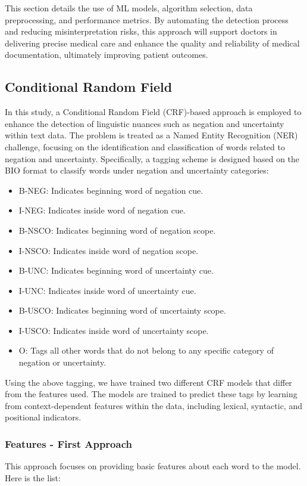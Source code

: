 \documentclass{article}
\begin{document}
This section details the use of ML models, algorithm selection, data preprocessing, and performance metrics. By
automating the detection process and reducing misinterpretation risks, this approach will support doctors in
delivering precise medical care and enhance the quality and reliability of medical documentation, ultimately
improving patient outcomes.

\subsection*{Conditional Random Field}
In this study, a Conditional Random Field (CRF)-based approach is employed to enhance the detection of linguistic
nuances such as negation and uncertainty within text data. The problem is treated as a Named Entity Recognition
(NER) challenge, focusing on the identification and classification of words related to negation and uncertainty.
Specifically, a tagging scheme is designed based on the BIO format to classify words under negation and uncertainty
categories:

\begin{itemize}[itemsep=0.02cm]
	\item B-NEG: Indicates beginning word of negation cue.
	\item I-NEG: Indicates inside word of negation cue.
	\item B-NSCO: Indicates beginning word of negation scope.
	\item I-NSCO: Indicates inside word of negation scope.
	\item B-UNC: Indicates beginning word of uncertainty cue.
	\item I-UNC: Indicates inside word of uncertainty cue.
	\item B-USCO: Indicates beginning word of uncertainty scope.
	\item I-USCO: Indicates inside word of uncertainty scope.
	\item O: Tags all other words that do not belong to any specific category of negation or uncertainty.
\end{itemize}

Using the above tagging, we have trained two different CRF models that differ from the features used. The models
are trained to predict these tags by learning from context-dependent features within the data, including lexical,
syntactic, and positional indicators.

\subsubsection*{Features - First Approach}
This approach focuses on providing basic features about each word to the model. Here is the list:
\end{document}
